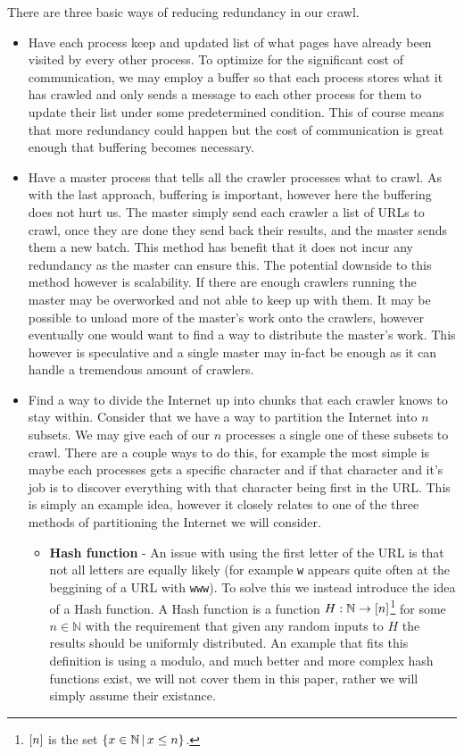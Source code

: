 \documentclass{article}
\begin{document}
	There are three basic ways of reducing redundancy in our crawl.
	\begin{itemize}
		\item Have each process keep and updated list of what pages have already been visited by every other process. To optimize for the significant cost of communication, we may employ a buffer so that each process stores what it has crawled and only sends a message to each other process for them to update their list under some predetermined condition. This of course means that more redundancy could happen but the cost of communication is great enough that buffering becomes necessary.
		
		\item Have a master process that tells all the crawler processes what to crawl. As with the last approach, buffering is important, however here the buffering does not hurt us. The master simply send each crawler a list of URLs to crawl, once they are done they send back their results, and the master sends them a new batch. This method has benefit that it does not incur any redundancy as the master can ensure this. The potential downside to this method however is scalability. If there are enough crawlers running the master may be overworked and not able to keep up with them. It may be possible to unload more of the master's work onto the crawlers, however eventually one would want to find a way to distribute the master's work. This however is speculative and a single master may in-fact be enough as it can handle a tremendous amount of crawlers.
		
		\item Find a way to divide the Internet up into chunks that each crawler knows to stay within. Consider that we have a way to partition the Internet into $n$ subsets. We may give each of our $n$ processes a single one of these subsets to crawl. There are a couple ways to do this, for example the most simple is maybe each processes gets a specific character and if that character and it's job is to discover everything with that character being first in the URL. This is simply an example idea, however it closely relates to one of the three methods of partitioning the Internet we will consider.
		
		\begin{itemize}
			\item \textbf{Hash function} - An issue with using the first letter of the URL is that not all letters are equally likely (for example \verb|w| appears quite often at the beggining of a URL with \verb|www|). To solve this we instead introduce the idea of a Hash function. A Hash function is a function $H:\mathbb N\to\left[ n \right]$\footnote{$\left[ n \right]$ is the set $\left\{{x\in\mathbb N} \,\middle|\, {x \le n}\right\}$.} for some $n\in\mathbb N$ with the requirement that given any random inputs to $H$ the results should be uniformly distributed. An example that fits this definition is using a modulo, and much better and more complex hash functions exist, we will not cover them in this paper, rather we will simply assume their existance.
			

\end{itemize}
\end{itemize}
\end{document}
